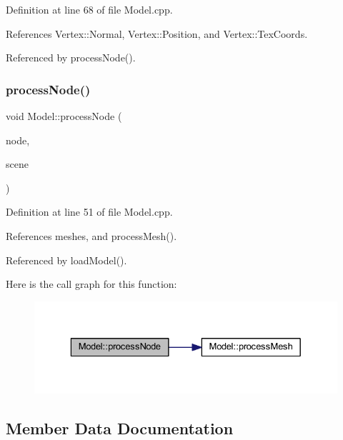 Definition at line 68 of file Model.\+cpp.



References Vertex\+::\+Normal, Vertex\+::\+Position, and Vertex\+::\+Tex\+Coords.



Referenced by process\+Node().

\mbox{\label{classModel_a23b167ce0d33f7e6ab5693cd5e81a9a5}} 
\subsubsection{\texorpdfstring{process\+Node()}{processNode()}}
{\footnotesize\ttfamily void Model\+::process\+Node (\begin{DoxyParamCaption}\item[{ai\+Node $\ast$}]{node,  }\item[{const ai\+Scene $\ast$}]{scene }\end{DoxyParamCaption})\hspace{0.3cm}{\ttfamily [private]}}



Definition at line 51 of file Model.\+cpp.



References meshes, and process\+Mesh().



Referenced by load\+Model().

Here is the call graph for this function\+:
\nopagebreak
\begin{figure}[H]
\begin{center}
\leavevmode
\includegraphics[width=329pt]{classModel_a23b167ce0d33f7e6ab5693cd5e81a9a5_cgraph}
\end{center}
\end{figure}


\subsection{Member Data Documentation}
\mbox{\label{classModel_a5ea3aa111c7a7d179e93dcc0bb567701}} 
